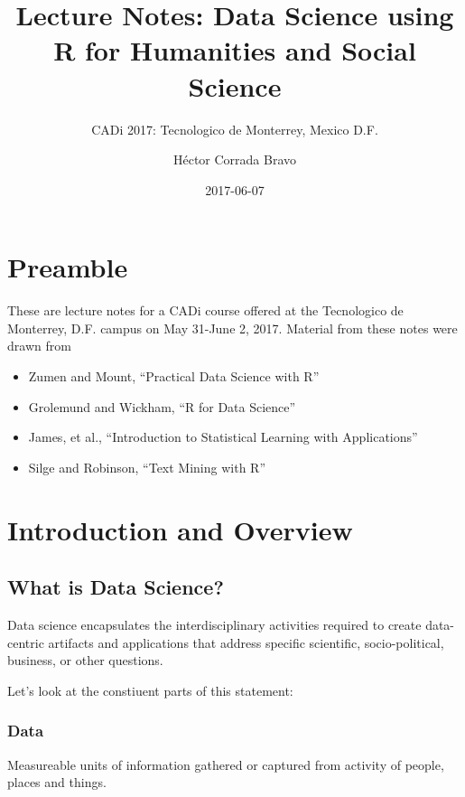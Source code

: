 \documentclass[12pt,]{book}
\title{Lecture Notes: Data Science using R for Humanities and Social Science}
\subtitle{CADi 2017: Tecnologico de Monterrey, Mexico D.F.}
\author{Héctor Corrada Bravo}
\date{2017-06-07}
\providecommand{\tightlist}{%
  \setlength{\itemsep}{0pt}\setlength{\parskip}{0pt}}
\theoremstyle{definition}
\theoremstyle{definition}
\theoremstyle{remark}
\begin{document}
\maketitle

{
\setcounter{tocdepth}{2}
\tableofcontents
}
\chapter{Preamble}\label{preamble}

These are lecture notes for a CADi course offered at the Tecnologico de
Monterrey, D.F. campus on May 31-June 2, 2017. Material from these notes
were drawn from

\begin{itemize}
\tightlist
\item
  Zumen and Mount, ``Practical Data Science with R''\\
\item
  Grolemund and Wickham, ``R for Data Science''\\
\item
  James, et al., ``Introduction to Statistical Learning with
  Applications''\\
\item
  Silge and Robinson, ``Text Mining with R''
\end{itemize}

\chapter{Introduction and Overview}\label{introduction-and-overview}

\section{What is Data Science?}\label{what-is-data-science}

Data science encapsulates the interdisciplinary activities required to
create data-centric artifacts and applications that address specific
scientific, socio-political, business, or other questions.

Let's look at the constiuent parts of this statement:

\subsection{Data}\label{data}

Measureable units of information gathered or captured from activity of
people, places and things.
\end{document}

